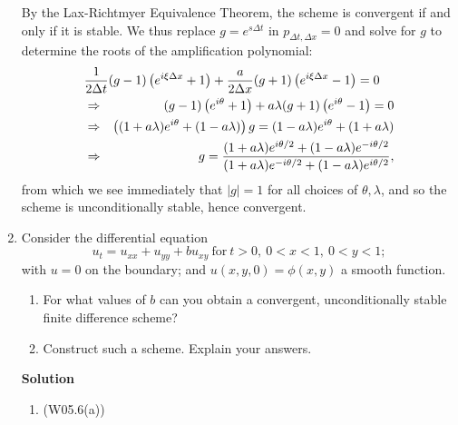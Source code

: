 \documentclass{article}
\begin{document}
\begin{enumerate}
By the Lax-Richtmyer Equivalence Theorem, the scheme is convergent if and only if it is stable.  We thus replace \(g = e^{s\Delta t}\) in \(p_{\Delta t, \Delta x} = 0\) and solve for \(g\) to determine the roots of the amplification polynomial:
\begin{eqnarray*}
\lefteqn{\frac{1}{2\Delta t} (g - 1) \left( e^{i\xi\Delta x} + 1 \right) + \frac{a}{2\Delta x} (g + 1) \left( e^{i\xi\Delta x} - 1 \right) = 0} \\
& \Rightarrow & (g - 1) \left( e^{i\theta} + 1 \right) + a \lambda (g + 1) \left( e^{i\theta} - 1 \right) = 0 \\
& \Rightarrow & \left( (1 + a\lambda) e^{i\theta} + (1 - a\lambda) \right) g = (1 - a\lambda) e^{i\theta} + (1 + a\lambda) \\
& \Rightarrow & g = \frac{(1 + a\lambda) e^{i\theta/2} + (1 - a\lambda) e^{-i\theta/2}}
                         {(1 + a\lambda) e^{-i\theta/2} + (1 - a\lambda) e^{i\theta/2}},
\end{eqnarray*}
from which we see immediately that \(|g| = 1\) for all choices of \(\theta, \lambda\), and so the scheme is unconditionally stable, hence convergent.



\item Consider the differential equation
\[u_t = u_{xx} + u_{yy} + bu_{xy} \ \text{for} \ t > 0, \ 0 < x < 1, \ 0 < y < 1;\]
with \(u = 0\) on the boundary; and \(u(x,y,0) = \phi(x,y)\) a smooth function.

\begin{enumerate}
\item For what values of \(b\) can you obtain a convergent, unconditionally stable finite difference scheme?

\item Construct such a scheme.  Explain your answers.

\end{enumerate}

{\bf Solution}

\begin{enumerate}
\item (W05.6(a))


\end{enumerate}
\end{enumerate}
\end{document}
